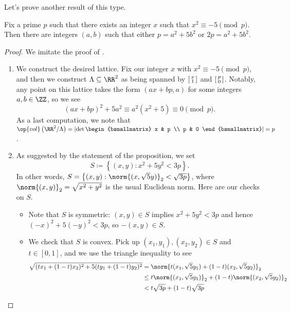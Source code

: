 \documentclass[../notes.tex]{subfiles}
\begin{document}
Let's prove another result of this type.
\begin{proposition} \label{prop:primes-of-form-5}
	Fix a prime $p$ such that there exists an integer $x$ such that $x^2\equiv-5\pmod p$. Then there are integers $(a,b)$ such that either $p=a^2+5b^2$ or $2p=a^2+5b^2$.
\end{proposition}
\begin{proof}
	We imitate the proof of .
	\begin{enumerate}
		\item We construct the desired lattice. Fix our integer $x$ with $x^2\equiv-5\pmod p$, and then we construct $\Lambda\subseteq\RR^2$ as being spanned by $\begin{bsmallmatrix}
			x \\ 1
		\end{bsmallmatrix}$ and $\begin{bsmallmatrix}
			p \\ 0
		\end{bsmallmatrix}$. Notably, any point on this lattice takes the form $(ax+bp,a)$ for some integers $a,b\in\ZZ$, so we see
		\[(ax+bp)^2+5a^2\equiv a^2\left(x^2+5\right)\equiv0\pmod p.\]
		As a last computation, we note that $\op{vol}\left(\RR^2/\Lambda\right)=\left|\det\begin{bsmallmatrix}
			x & p \\
			p & 0
		\end{bsmallmatrix}\right|=p$.
		\item As suggested by the statement of the proposition, we set
		\[S\coloneqq\left\{(x,y):x^2+5y^2<3p\right\}.\]
		In other words, $S=\left\{(x,y):\norm{(x,\sqrt 5y)}_2<\sqrt{3p}\right\}$, where $\norm{(x,y)}_2=\sqrt{x^2+y^2}$ is the usual Euclidean norm. Here are our checks on $S$.
		\begin{itemize}
			\item Note that $S$ is symmetric: $(x,y)\in S$ implies $x^2+5y^2<3p$ and hence $(-x)^2+5(-y)^2<3p$, so $-(x,y)\in S$.
			\item We check that $S$ is convex. Pick up $(x_1,y_1),(x_2,y_2)\in S$ and $t\in[0,1]$, and we use the triangle inequality to see
			\begin{align*}
				\sqrt{(tx_1+(1-t)x_2)^2+5(ty_1+(1-t)y_2)^2} &= \norm{t(x_1,\sqrt 5y_1)+(1-t)(x_2,\sqrt5y_2)}_2 \\
				&\le t\norm{(x_1,\sqrt5y_1)}_2+(1-t)\norm{(x_2,\sqrt5y_2)}_2 \\
				&< t\sqrt{3p}+(1-t)\sqrt{3p} \\

\end{align*}
\end{itemize}
\end{enumerate}
\end{proof}
\end{document}

